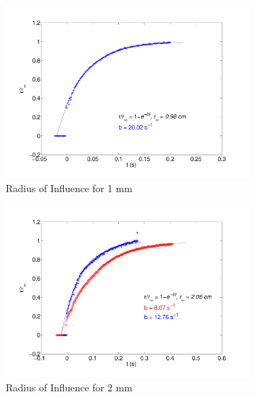 \documentclass[12pt]{article}
\begin{document}
\begin{figure}[h]
	\begin{subfigure}[h]{0.5\textwidth}
    \centering
       \includegraphics[scale=0.3]{roi_1mm_250mm.pdf}
       \caption{Radius of Influence for 1 mm}
       \label{fig:roi1mm}
	\end{subfigure}
	\hfill
	\begin{subfigure}[h]{0.5\textwidth}
    \centering
       \includegraphics[scale=0.3]{roi_2mm_250mm.pdf}
       \caption{Radius of Influence for 2 mm}
       \label{fig:roi2mm}
	\end{subfigure}
	\newline
	\begin{subfigure}[h]{0.5\textwidth}
    \centering

\end{subfigure}
\end{figure}
\end{document}
